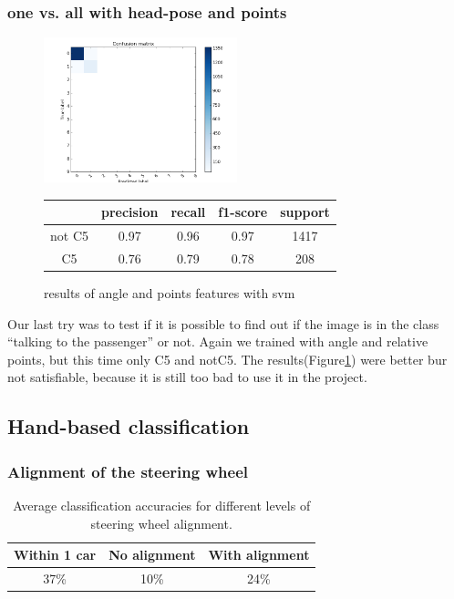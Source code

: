 \documentclass[10pt,twocolumn,letterpaper]{article}
\begin{document}
\subsubsection{one vs. all with head-pose and points}
\begin{figure}[h]
	\centering
	\includegraphics[width=0.5\textwidth]{c5ornot.png}\hspace{0.01\textwidth}
	\begin{tabular}{c||c|c|c|c}
	  & precision&recall&f1-score&support\\	\hline
	  not C5&0.97&0.96&0.97&1417\\
	  C5&0.76&0.79&0.78&208
	\end{tabular}
	\caption{results of angle and points features with svm}
	\label{C5ornot}
	\end{figure}
Our last try was to test if it is possible to find out if the image is in the class ``talking to the passenger'' or not. Again we trained with angle and relative points, but this time only C5 and notC5. The results(Figure\ref{C5ornot}) were better bur not satisfiable, because it is still too bad to use it in the project.

\subsection{Hand-based classification}

	\subsubsection{Alignment of the steering wheel}
	\begin{table}
		\begin{tabular}{c|c|c}
			Within 1 car & No alignment & With alignment \\ 
			\hline 
			37\% & 10\% & 24\% \\ 
		\end{tabular} 
		\caption{Average classification accuracies for different levels of steering wheel alignment.}
		\label{hand_estimation_alignment}
	\end{table}
	
\end{document}
